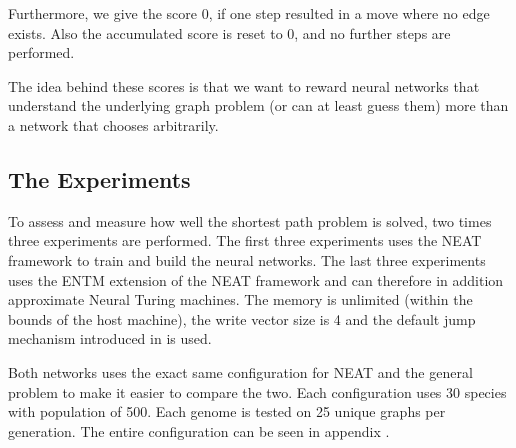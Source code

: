 \noindent Furthermore, we give the score 0, if one step resulted in a move where no edge exists. Also the accumulated score is reset to 0, and no further steps are performed.

\newpar The idea behind these scores is that we want to reward neural networks that understand the underlying graph problem (or can at least guess them) more than a network that chooses arbitrarily.

\subsection{The Experiments}
To assess and measure how well the shortest path problem is solved, two times three experiments are performed. The first three experiments uses the NEAT framework to train and build the neural networks. The last three experiments uses the ENTM extension of the NEAT framework and can therefore in addition approximate Neural Turing machines. The memory is unlimited (within the bounds of the host machine), the write vector size is 4 and the default jump mechanism introduced in \cite{greve2016evolving} is used. 

\newpar Both networks uses the exact same configuration for NEAT and the general problem to make it easier to compare the two. Each configuration uses 30 species with population of 500. Each genome is tested on 25 unique graphs per generation. The entire configuration can be seen in appendix . 